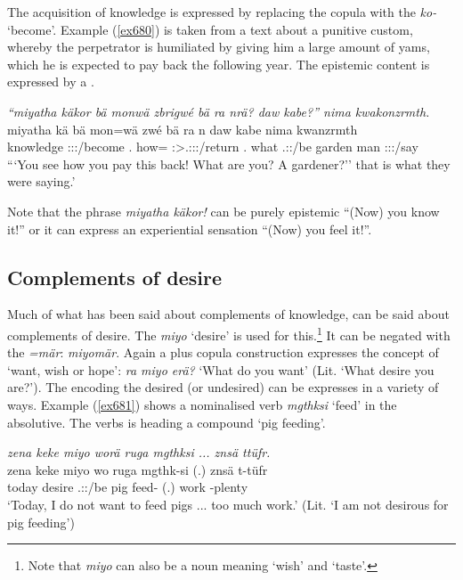 The acquisition of knowledge is expressed by replacing the copula with the  \emph{ko-} `become'. Example (\ref{ex680}) is taken from a text about a punitive custom, whereby the perpetrator is humiliated by giving him a large amount of yams, which he is expected to pay back the following year. The epistemic content is expressed by a .

\begin{exe}
	\ex \emph{``miyatha käkor bä monwä zbrigwé bä ra nrä? daw kabe?'' nima kwakonzrmth.}\\
	\gll miyatha kä bä mon=wä zwé bä ra n daw kabe nima kwanzrmth\\
	knowledge \Ssg:\Sbj:\Imp:\Pfv/become \Second.\Abs{} how=\Emph{} \Ssg:\Sbj>\Tsg.\F:\Sbj:\Imp:\Ipfv/return \Second.\Abs{} what \Ssg.\Sbj:\Nonpast:\Ipfv/be garden man \Quot{} \Stpl:\Sbj:\Pst:\Dur/say\\
	\trans ```You see how you pay this back! What are you? A gardener?'' that is what they were saying.'
	\label{ex680}
\end{exe}

Note that the phrase \emph{miyatha käkor!} can be purely epistemic ``(Now) you know it!'' or it can express an experiential sensation ``(Now) you feel it!''.

\subsection{Complements of desire}\label{compldesire}

Much of what has been said about complements of knowledge, can be said about complements of desire. The  \emph{miyo} `desire' is used for this.\footnote{Note that \emph{miyo} can also be a noun meaning `wish' and `taste'.} It can be negated with the   \emph{=mär}: \emph{miyomär}. Again a  plus copula construction expresses the concept of `want, wish or hope': \emph{ra miyo erä?} `What do you want' (Lit. `What desire you are?'). The  encoding the desired (or undesired) can be expresses in a variety of ways. Example (\ref{ex681}) shows a nominalised verb \emph{mgthksi} `feed' in the absolutive. The verbs is heading a compound `pig feeding'.

\begin{exe}
	\ex \emph{zena keke miyo worä ruga mgthksi ... znsä ttüfr.}\\
	\gll zena keke miyo wo ruga mgthk-si (.) znsä t-tüfr\\
	today \Neg{} desire \Fsg.\Sbj:\Nonpast:\Ipfv/be pig feed-\Nmlz{} (.) work \Redup-plenty\\
	\trans `Today, I do not want to feed pigs ... too much work.' (Lit. `I am not desirous for pig feeding')
	\label{ex681}
\end{exe}

